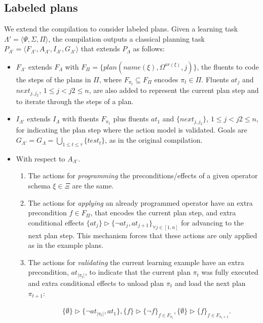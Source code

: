 \documentclass[letterpaper]{article} %
\newcommand{\tup}[1]{{\langle #1 \rangle}}
\begin{document}
\subsection{Labeled plans}
We extend the compilation to consider labeled plans. Given a learning task $\Lambda'=\tup{\Psi,\Sigma,\Pi}$, the compilation outputs a classical planning task $P_{\Lambda'}=\tup{F_{\Lambda'},A_{\Lambda'},I_{\Lambda'},G_{\Lambda'}}$ that extends $P_{\Lambda}$ as follows:
\begin{itemize}
\item $F_{\Lambda'}$ extends $F_{\Lambda}$ with $F_{\Pi}=\{plan(name(\xi),\Omega^{ar(\xi)},j)\}$, the fluents to code the steps of the plans in $\Pi$, where $F_{\pi_t}\subseteq F_{\Pi}$ encodes $\pi_t\in \Pi$. Fluents $at_j$ and $next_{j,j_2}$, {\small $1\leq j<j2\leq n$}, are also added to represent the current plan step and to iterate through the steps of a plan.
\item $I_{\Lambda'}$ extends $I_{\Lambda}$ with fluents $F_{\pi_1}$ plus fluents $at_1$ and $\{next_{j,j_2}\}$, {\small $1\leq j<j2\leq n$}, for indicating the plan step where the action model is validated. Goals are $G_{\Lambda'}=G_{\Lambda}=\bigcup_{1\leq t\leq \tau}\{test_t\}$, as in the original compilation.
\item With respect to $A_{\Lambda'}$.
\begin{enumerate}
\item The actions for {\em programming} the preconditions/effects of a given operator schema $\xi\in\Xi$ are the same.
\item The actions for {\em applying} an already programmed operator have an extra precondition $f\in F_{\Pi}$, that encodes the current plan step, and extra conditional effects $\{at_{j}\}\rhd\{\neg at_{j},at_{j+1}\}_{\forall j\in [1,n]}$ for advancing to the next plan step. This mechanism forces that these actions are only applied as in the example plans.
\item The actions for {\em validating} the current learning example have an extra precondition, $at_{|\pi_t|}$, to indicate that the current plan $\pi_t$ was fully executed and extra conditional effects to unload plan $\pi_{t}$ and load the next plan $\pi_{t+1}$:
\begin{small}
\begin{align*}
&\{\emptyset\}\rhd\{\neg at_{|\pi_t|},at_1\}, \{f\}\rhd\{\neg f\}_{f\in F_{\pi_t}}, \{\emptyset\}\rhd\{f\}_{f\in F_{\pi_t+1}}.
\end{align*}
\end{small}
\end{enumerate}
\end{itemize}
\end{document}

